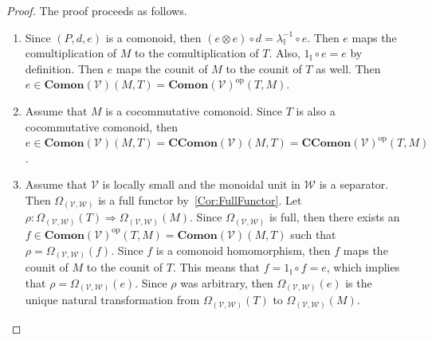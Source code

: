 \begin{proof}
    The proof proceeds as follows.
    \begin{enumerate}
    \item Since $( P, d, e )$ is a comonoid, then $( e \otimes e ) \circ d = \lambda_{\mathbb{I}}^{-1} \circ e$.
          Then $e$ maps the comultiplication of $M$ to the comultiplication of $T$.
          Also, $1_\mathbb{I} \circ e = e$ by definition.
          Then $e$ maps the counit of $M$ to the counit of $T$ as well.
          Then $e \in \mathbf{Comon}( \mathcal{V} )( M, T ) = \mathbf{Comon}( \mathcal{V} )^{\text{op}}( T, M )$.
    \item Assume that $M$ is a cocommutative comonoid.
          Since $T$ is also a cocommutative comonoid, then $e \in \mathbf{Comon}( \mathcal{V} )( M, T ) = \mathbf{CComon}( \mathcal{V} )( M, T ) = \mathbf{CComon}( \mathcal{V} )^{\text{op}}( T, M )$.
    \item Assume that $\mathcal{V}$ is locally small and the monoidal unit in $\mathcal{W}$ is a separator.
          Then $\Omega_{(\mathcal{V},\mathcal{W})}$ is a full functor by~\cref{Cor:FullFunctor}.
          Let $\rho: \Omega_{(\mathcal{V},\mathcal{W})}( T ) \Rightarrow \Omega_{(\mathcal{V},\mathcal{W})}( M )$.
          Since $\Omega_{(\mathcal{V},\mathcal{W})}$ is full, then there exists an $f \in \mathbf{Comon}( \mathcal{V} )^{\text{op}}( T, M ) = \mathbf{Comon}( \mathcal{V} )( M, T )$ such that $\rho = \Omega_{(\mathcal{V},\mathcal{W})}( f )$.
          Since $f$ is a comonoid homomorphism, then $f$ maps the counit of $M$ to the counit of $T$.
          This means that $f = 1_\mathbb{I} \circ f = e$, which implies that $\rho = \Omega_{(\mathcal{V},\mathcal{W})}( e )$.
          Since $\rho$ was arbitrary, then $\Omega_{(\mathcal{V},\mathcal{W})}( e )$ is the unique natural transformation from $\Omega_{(\mathcal{V},\mathcal{W})}( T )$ to $\Omega_{(\mathcal{V},\mathcal{W})}( M )$.
          \endproof
    \end{enumerate}
\end{proof}

